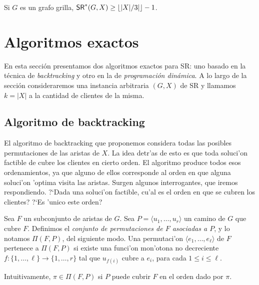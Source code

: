 \begin{corollary}
\label{co:sr_floor}
Si $G$ es un grafo grilla, $\textnormal{\textsf{SR}}^*(G, X) \geq \left\lfloor |X| / 3| \right\rfloor - 1$.
\end{corollary}

\section{Algoritmos exactos}

En esta sección presentamos dos algoritmos exactos para SR: uno basado en la técnica de \emph{backtracking} y otro en la de \emph{programación dinámica}. A lo largo de la sección consideraremos una instancia arbitraria $(G, X)$ de SR y llamamos $k = |X|$ a la cantidad de clientes de la misma.

\subsection{Algoritmo de backtracking}

El algoritmo de backtracking que proponemos considera todas las posibles permutaciones de las aristas de $X$. La idea detr'as de esto es que toda soluci'on factible de  cubre los clientes en cierto orden. El algoritmo produce todos esos ordenamientos, ya que alguno de ellos corresponde al orden en que alguna soluci'on 'optima visita las aristas. Surgen algunos interrogantes, que iremos respondiendo. ?`Dada una soluci'on factible, cu'al es el orden en que se cubren los clientes? ?`Es 'unico este orden?

\begin{definition}
\label{de:conjunto_de_permutaciones}
Sea $F$ un subconjunto de aristas de $G$. Sea $P = \langle u_1, \dots, u_r \rangle$ un camino de $G$ que cubre $F$. Definimos el \textit{conjunto de permutaciones de $F$ asociadas a $P$}, y lo notamos $\Pi(F, P)$, del siguiente modo. Una permutaci'on $\langle e_1, \dots, e_{\ell} \rangle$ de $F$ pertenece a $\Pi(F, P)$ si existe una funci'on mon'otona no decreciente $f: \{1, \dots, \ell\} \to \{1, \dots, r\}$ tal que $u_{f(i)}$ cubre a $e_i$, para cada $1 \leq i \leq \ell$.
\end{definition}

\noindent
Intuitivamente, $\pi \in \Pi(F, P)$ si $P$ puede cubrir $F$ en el orden dado por $\pi$.


